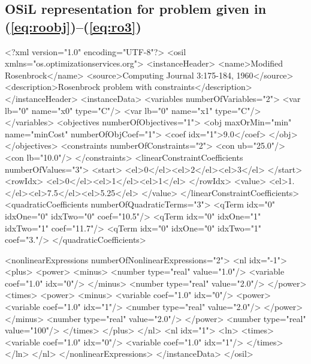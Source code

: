 \documentclass[11pt]{article}
\renewcommand{\_}{{\char"5F}}
\renewcommand{\{}{{\char"7B}}
\renewcommand{\}}{{\char"7D}}
\renewcommand{\^}{{\char"0D}}
\renewcommand{\'}{{\char"0D}}
\begin{document}
\subsection{OSiL representation for problem given in
(\ref{eq:roobj})--(\ref{eq:ro3})}\label{section:rosenbrockXML}


{\normalsize \baselineskip 16pt \vspace{2pt}
\begin{verbatimtab}[5]
<?xml version="1.0" encoding="UTF-8"?>
<osil xmlns="os.optimizationservices.org">
	<instanceHeader>
		<name>Modified Rosenbrock</name>
		<source>Computing Journal 3:175-184, 1960</source>
		<description>Rosenbrock problem with constraints</description>
	</instanceHeader>
	<instanceData>
		<variables numberOfVariables="2">
			<var lb="0" name="x0" type="C"/>
			<var lb="0" name="x1" type="C"/>
		</variables>
		<objectives numberOfObjectives="1">
			<obj maxOrMin="min" name="minCost" numberOfObjCoef="1">
				<coef idx="1">9.0</coef>
			</obj>
		</objectives>
		<constraints numberOfConstraints="2">
			<con ub="25.0"/>
			<con lb="10.0"/>
		</constraints>
		<linearConstraintCoefficients numberOfValues="3">
			<start>
				<el>0</el><el>2</el><el>3</el>
			</start>
			<rowIdx>
				<el>0</el><el>1</el><el>1</el>
			</rowIdx>
			<value>
				<el>1.</el><el>7.5</el><el>5.25</el>
			</value>
		</linearConstraintCoefficients>
		<quadraticCoefficients numberOfQuadraticTerms="3">
			<qTerm idx="0" idxOne="0" idxTwo="0" coef="10.5"/>
			<qTerm idx="0" idxOne="1" idxTwo="1" coef="11.7"/>
			<qTerm idx="0" idxOne="0" idxTwo="1" coef="3."/>
		</quadraticCoefficients>
\end{verbatimtab}
   \newpage
\begin{verbatimtab}[5]
		<nonlinearExpressions numberOfNonlinearExpressions="2">
			<nl idx="-1">
				<plus>
					<power>
						<minus>
							<number type="real" value="1.0"/>
							<variable coef="1.0" idx="0"/>
						</minus>
						<number type="real" value="2.0"/>
					</power>
					<times>
						<power>
							<minus>
								<variable coef="1.0" idx="0"/>
								<power>
									<variable coef="1.0" idx="1"/>
									<number type="real" value="2.0"/>
								</power>
							</minus>
							<number type="real" value="2.0"/>
						</power>
						<number type="real" value="100"/>
					</times>
				</plus>
			</nl>
			<nl idx="1">
				<ln>
					<times>
						<variable coef="1.0" idx="0"/>
						<variable coef="1.0" idx="1"/>
					</times>
				</ln>
			</nl>
		</nonlinearExpressions>
	</instanceData>
</osil>
\end{verbatimtab}

}%
\end{document}

